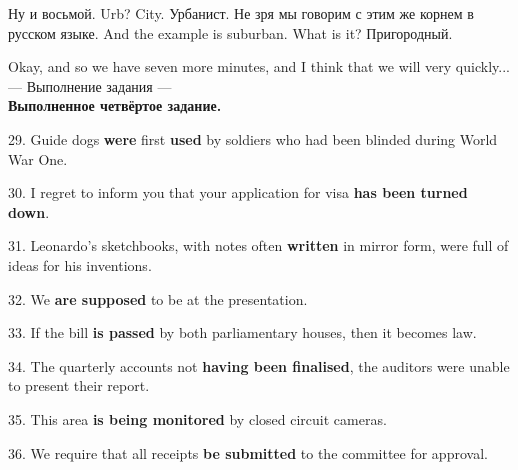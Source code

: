 \documentclass[main.tex]{subfiles}
\begin{document}
Ну и восьмой. Urb?
City. Урбанист.
Не зря мы говорим с этим же корнем в русском языке.
And the example is suburban.
What is it? Пригородный.

Okay, and so we have seven more minutes, and I think that we will very quickly...
\\

--- Выполнение задания ---
\\

\textbf{Выполненное четвёртое задание.}

29. Guide dogs \textbf{were} first \textbf{used} by soldiers who had been blinded during World War One.

30. I regret to inform you that your application for visa \textbf{has been turned down}.

31. Leonardo's sketchbooks, with notes often \textbf{written} in mirror form, were full of ideas for his inventions.

32. We \textbf{are supposed} to be at the presentation.

33. If the bill \textbf{is passed} by both parliamentary houses, then it becomes law.

34. The quarterly accounts not \textbf{having been finalised}, the auditors were unable to present their report.

35. This area \textbf{is being monitored} by closed circuit cameras.

36. We require that all receipts \textbf{be submitted} to the committee for approval.
\\
\end{document}

